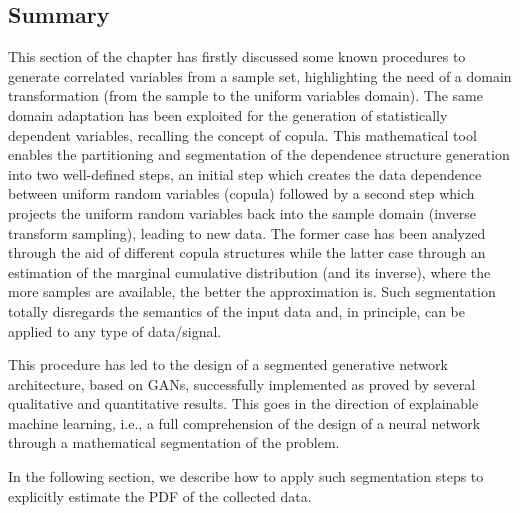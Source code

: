 \subsection{Summary}
This section of the chapter has firstly discussed some known procedures to generate correlated variables from a sample set, highlighting the need of a domain transformation (from the sample to the uniform variables domain). The same domain adaptation has been exploited for the generation of statistically dependent variables, recalling the concept of copula. This mathematical tool enables the partitioning and segmentation of the dependence structure generation into two well-defined steps, an initial step which creates the data dependence between uniform random variables (copula) followed by a second step which projects the uniform random variables back into the sample domain (inverse transform sampling), leading to new data. 
The former case has been analyzed through the aid of different copula structures while the latter case through an estimation of the marginal cumulative distribution (and its inverse), where the more samples are available, the better the approximation is. Such segmentation totally disregards the semantics of the input data and, in principle, can be applied to any type of data/signal. 

This procedure has led to the design of a segmented generative network architecture, based on GANs, successfully implemented as proved by several qualitative and quantitative results. This goes in the direction of explainable machine learning, i.e., a full comprehension of the design of a neural network through a mathematical segmentation of the problem.

In the following section, we describe how to apply such segmentation steps to explicitly estimate the PDF of the collected data.

